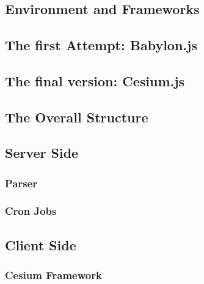 \section{\applicationName} \label{projectDesign}
\subsection{Environment and Frameworks}
\subsection{The first Attempt: Babylon.js}
\subsection{The final version: Cesium.js}
\subsection{The Overall Structure}
\subsection{Server Side}
\subsubsection{Parser}
\subsubsection{Cron Jobs}
\subsection{Client Side}
\subsubsection{Cesium Framework}